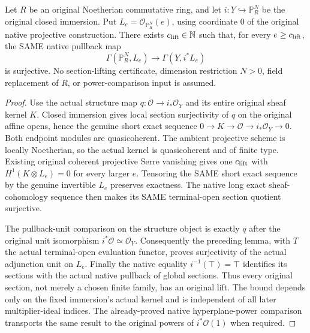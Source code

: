 \begin{lemma}
\label{lem:c0n-eventual-relative-section-restriction}
\leanok
{}
Let $R$ be an original Noetherian commutative ring, and let
$i:Y\hookrightarrow\mathbb P_R^N$ be the original closed immersion. Put
$L_e=\mathcal O_{\mathbb P_R^N}(e)$, using coordinate $0$ of the original
native projective construction. There exists $c_{\rm lift}\in\mathbb N$
such that, for every $e\ge c_{\rm lift}$, the SAME native pullback map
\[
 \Gamma(\mathbb P_R^N,L_e)\longrightarrow\Gamma(Y,i^*L_e)
\]
is surjective. No section-lifting certificate, dimension restriction
$N>0$, field replacement of $R$, or power-comparison input is assumed.
\end{lemma}
\begin{proof}
Use the actual structure map $q:\mathcal O\to i_*\mathcal O_Y$ and its
entire original sheaf kernel $K$. Closed immersion gives local section
surjectivity of $q$ on the original affine opens, hence the genuine short
exact sequence $0\to K\to\mathcal O\to i_*\mathcal O_Y\to0$.
Both endpoint modules are quasicoherent. The ambient projective scheme is
locally Noetherian, so the actual kernel is quasicoherent and of finite
type. Existing original coherent projective Serre vanishing gives one
$c_{\rm lift}$ with $H^1(K\otimes L_e)=0$ for every larger $e$.
Tensoring the SAME short exact sequence by the genuine invertible $L_e$
preserves exactness. The native long exact sheaf-cohomology sequence then
makes its SAME terminal-open section quotient surjective.

The pullback-unit comparison on the structure object is exactly $q$ after
the original unit isomorphism $i^*\mathcal O\simeq\mathcal O_Y$.
Consequently the preceding lemma, with $T$ the actual terminal-open
evaluation functor, proves surjectivity of the actual adjunction unit on
$L_e$. Finally the native equality $i^{-1}(\top)=\top$ identifies its
sections with the actual native pullback of global sections. Thus every
original section, not merely a chosen finite family, has an original lift.
The bound depends only on the fixed immersion's actual kernel and is
independent of all later multiplier-ideal indices. The already-proved
native hyperplane-power comparison transports the same result to the
original powers of $i^*\mathcal O(1)$ when required.
\end{proof}
